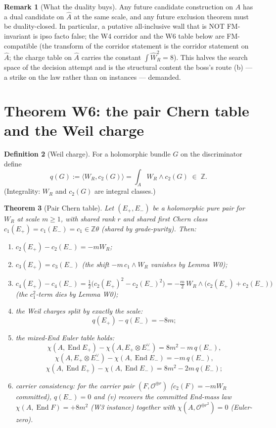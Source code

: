 \documentclass[11pt]{article}
\newtheorem{theorem}{Theorem}[section]
\theoremstyle{definition}
\newtheorem{definition}[theorem]{Definition}
\newtheorem{remark}[theorem]{Remark}
\newcommand{\End}{\operatorname{End}}
\newcommand{\Z}{\mathbb{Z}}
\begin{document}
\begin{remark}[What the duality buys]
Any future candidate construction on $A$ has a dual candidate on
$\widehat A$ at the same scale, and any future exclusion theorem must be
duality-closed. In particular, a putative all-inclusive wall that is NOT
FM-invariant is ipso facto false; the W4 corridor and the W6 table below are
FM-compatible (the transform of the corridor statement is the corridor
statement on $\widehat A$; the charge table on $\widehat A$ carries the
constant $\int\widehat W_R^2=8$). This halves the search space of the
decision attempt and is the structural content the boss's route (b) ---
a strike on the law rather than on instances --- demanded.
\end{remark}

\section{Theorem W6: the pair Chern table and the Weil charge}\label{sec:w6}

\begin{definition}[Weil charge]\label{def:charge}
For a holomorphic bundle $G$ on the discriminator define
\[
q(G):=\langle W_R, c_2(G)\rangle=\int_A W_R\wedge c_2(G)\;\in\;\Z .
\]
(Integrality: $W_R$ and $c_2(G)$ are integral classes.)
\end{definition}

\begin{theorem}[Pair Chern table]\label{thm:w6}
Let $(E_+,E_-)$ be a holomorphic pure pair for $W_R$ at scale $m\ge 1$, with
shared rank $r$ and shared first Chern class $c_1(E_+)=c_1(E_-)=c_1\in\Z\theta$
(shared by grade-purity). Then:
\begin{enumerate}
\item[(i)] $c_2(E_+)-c_2(E_-)=-mW_R$;
\item[(ii)] $c_3(E_+)=c_3(E_-)$ (the shift $-m\,c_1\wedge W_R$ vanishes by
Lemma W0);
\item[(iii)] $c_4(E_+)-c_4(E_-)=\tfrac12\bigl(c_2(E_+)^2-c_2(E_-)^2\bigr)
=-\tfrac{m}{2}\,W_R\wedge\bigl(c_2(E_+)+c_2(E_-)\bigr)$
(the $c_1^2$-term dies by Lemma W0);
\item[(iv)] the Weil charges split by exactly the scale:
\[
q(E_+)-q(E_-)=-8m;
\]
\item[(v)] the mixed-End Euler table holds:
\[
\chi(A,\End E_+)-\chi(A,E_+\otimes E_-^\vee)=8m^2-m\,q(E_-),
\]
\[
\chi(A,E_+\otimes E_-^\vee)-\chi(A,\End E_-)=-m\,q(E_-),
\]
\[
\chi(A,\End E_+)-\chi(A,\End E_-)=8m^2-2m\,q(E_-);
\]
\item[(vi)] carrier consistency: for the carrier pair $(F,\mathcal O^{\oplus r})$
($c_2(F)=-mW_R$ committed), $q(E_-)=0$ and (v) recovers the committed
End-mass law $\chi(A,\End F)=+8m^2$ (W3 instance) together with
$\chi(A,\mathcal O^{\oplus r^2})=0$ (Euler-zero).
\end{enumerate}
\end{theorem}
\end{document}
